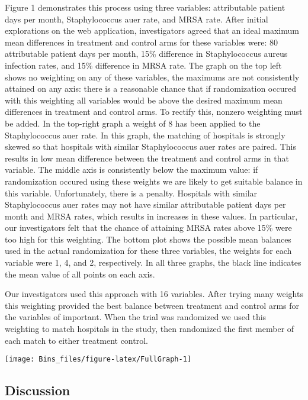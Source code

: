 \documentclass[]{sagej}
\begin{document}
Figure 1 demonstrates this process using three variables: attributable
patient days per month, Staphylococcus auer rate, and MRSA rate. After
initial explorations on the web application, investigators agreed that
an ideal maximum mean differences in treatment and control arms for
these variables were: 80 attributable patient days per month, 15\%
difference in Staphylococcus aureus infection rates, and 15\% difference
in MRSA rate. The graph on the top left shows no weighting on any of
these variables, the maximums are not consistently attained on any axis:
there is a reasonable chance that if randomization occured with this
weighting all variables would be above the desired maximum mean
differences in treatment and control arms. To rectify this, nonzero
weighting must be added. In the top-right graph a weight of 8 has been
applied to the Staphylococcus auer rate. In this graph, the matching of
hospitals is strongly skewed so that hospitals with similar
Staphylococcus auer rates are paired. This results in low mean
difference between the treatment and control arms in that variable. The
middle axis is consistently below the maximum value: if randomization
occured using these weights we are likely to get suitable balance in
this variable. Unfortunately, there is a penalty. Hospitals with similar
Staphylococcus auer rates may not have similar attributable patient days
per month and MRSA rates, which results in increases in these values. In
particular, our investigators felt that the chance of attaining MRSA
rates above 15\% were too high for this weighting. The bottom plot shows
the possible mean balances used in the actual randomization for these
three variables, the weights for each variable were 1, 4, and 2,
respectively. In all three graphs, the black line indicates the mean
value of all points on each axis.

Our investigators used this approach with 16 variables. After trying
many weights this weighting provided the best balance between treatment
and control arms for the variables of important. When the trial was
randomized we used this weighting to match hospitals in the study, then
randomized the first member of each match to either treatment control.

\begin{center}\texttt{[image: Bins\_files/figure-latex/FullGraph-1]} \end{center}

\subsection{Discussion}\label{discussion}
\end{document}
